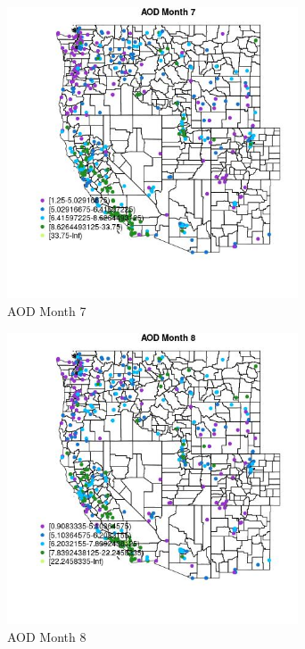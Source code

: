 \begin{figure} 
\centering  
\includegraphics[width=0.77\textwidth]{Code_Outputs/ML_input_report_ML_input_PM25_Step5_part_d_de_duplicated_aves_ML_input_MapObsMo7AOD.jpg} 
\caption{\label{fig:ML_input_report_ML_input_PM25_Step5_part_d_de_duplicated_aves_ML_inputMapObsMo7AOD}AOD Month 7} 
\end{figure} 
 

\begin{figure} 
\centering  
\includegraphics[width=0.77\textwidth]{Code_Outputs/ML_input_report_ML_input_PM25_Step5_part_d_de_duplicated_aves_ML_input_MapObsMo8AOD.jpg} 
\caption{\label{fig:ML_input_report_ML_input_PM25_Step5_part_d_de_duplicated_aves_ML_inputMapObsMo8AOD}AOD Month 8} 
\end{figure} 
 

